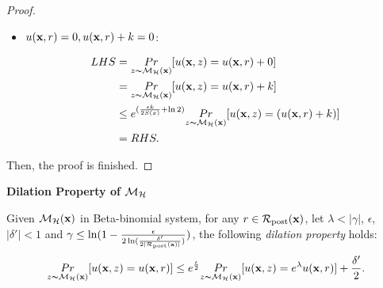 \documentclass{article}
\begin{document}
\begin{proof}
\begin{itemize}
  \item {\boldmath $u(\textbf{x}, {r}) = 0, u(\textbf{x}, {r}) + k = 0$}: 

        \begin{equation*}
        \begin{split}
        LHS 
        & = \underset{z \thicksim \mathcal{M}_{\mathcal{H}}(\textbf{x})}{Pr}[u(\textbf{x}, {z}) = u(\textbf{x}, {r}) + 0]\\
        & = \underset{z \thicksim \mathcal{M}_{\mathcal{H}}(\textbf{x})}{Pr}[u(\textbf{x}, {z}) = u(\textbf{x}, {r}) + k]\\
        & \leq e^{(\frac{\epsilon k}{2 S(x)} + \ln 2)} \underset{z \thicksim \mathcal{M}_{\mathcal{H}}(\textbf{x})}{Pr}[u(\textbf{x}, {z}) = ( u(\textbf{x}, {r}) + k)]\\
        & = RHS.
        \end{split}
        \end{equation*} 

\end{itemize}
Then, the proof is finished.

\end{proof}



\noindent \textbf{Dilation Property of $\mathcal{M}_{\mathcal{H}}$}
\begin{lem}
\label{lem_dilation}
Given $\mathcal{M}_{\mathcal{H}}(\textbf{x})$ in Beta-binomial system, for any $r\in \mathcal{R}_{\textup{post}}(\textbf{x})$, let $\lambda < |\gamma|$, $\epsilon$, $|\delta'| < 1$ and $\gamma \leq \ln(1 - \frac{\epsilon}{2 \ln (\frac{\delta'}{2 |\mathcal{R}_{\textup{post}}(\textbf{x})|})})$, the following \emph{dilation property} holds:
\begin{equation*}
\underset{z \thicksim \mathcal{M}_{\mathcal{H}}(\textbf{x})}{Pr}[u(\textbf{x}, {z}) = u(\textbf{x}, {r})]
\leq
e^{\frac{\epsilon}{2}} \underset{z \thicksim \mathcal{M}_{\mathcal{H}}(\textbf{x})}{Pr}[u(\textbf{x}, {z}) = e^{\lambda} u(\textbf{x}, {r})] + \frac{\delta'}{2}.
\end{equation*}
\end{lem}
\end{document}

